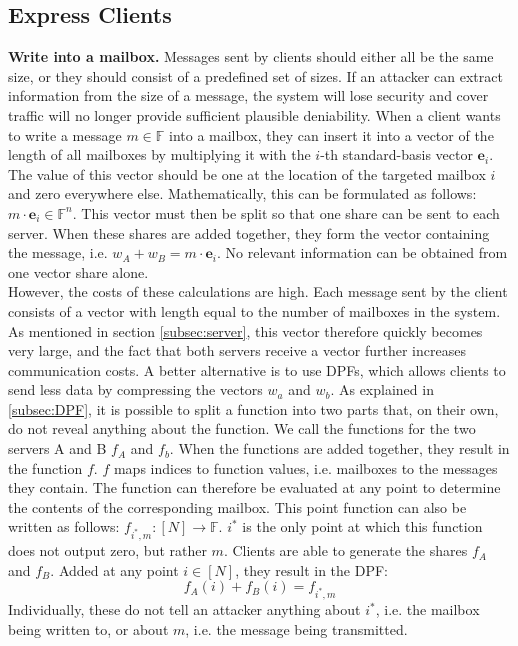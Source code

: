\documentclass[a4paper]{article}
\begin{document}
\subsection{Express Clients} \label{subsec:clients}
\textbf{Write into a mailbox.}
Messages sent by clients should either all be the same size, or they should consist of a predefined set of sizes. If an attacker can extract information from the size of a message, the system will lose security and cover traffic will no longer provide sufficient plausible deniability.
When a client wants to write a message $m \in \mathbb{F}$ into a mailbox, they can insert it into a vector of the length of all mailboxes by multiplying it with the $i$-th standard-basis vector $\mathbf{e}_i$. The value of this vector should be one at the location of the targeted mailbox $i$ and zero everywhere else. Mathematically, this can be formulated as follows: $m \cdot \mathbf{e}_i \in \mathbb{F}^n$. This vector must then be split so that one share can be sent to each server. When these shares are added together, they form the vector containing the message, i.e. $w_A + w_B = m \cdot \mathbf{e}_i$. No relevant information can be obtained from one vector share alone. \\
However, the costs of these calculations are high. Each message sent by the client consists of a vector with length equal to the number of mailboxes in the system. As mentioned in section \ref{subsec:server}, this vector therefore quickly becomes very large, and the fact that both servers receive a vector further increases communication costs.        
A better alternative is to use DPFs, which allows clients to send less data by compressing the vectors $w_a$ and $w_b$. As explained in \ref{subsec:DPF}, it is possible to split a function into two parts that, on their own, do not reveal anything about the function. We call the functions for the two servers A and B $f_A$ and $f_b$. When the functions are added together, they result in the function $f$. $f$ maps indices to function values, i.e. mailboxes to the messages they contain. The function can therefore be evaluated at any point to determine the contents of the corresponding mailbox. This point function can also be written as follows: $f_{i^*,m}: [N] \rightarrow \mathbb{F}$. $i^*$ is the only point at which this function does not output zero, but rather $m$. Clients are able to generate the shares $f_A$ and $f_B$. Added at any point $i \in [N]$, they result in the DPF: \[f_A(i) + f_B(i) = f_{i^*,m}\] Individually, these do not tell an attacker anything about $i^*$, i.e. the mailbox being written to, or about $m$, i.e. the message being transmitted. \\
\end{document}
